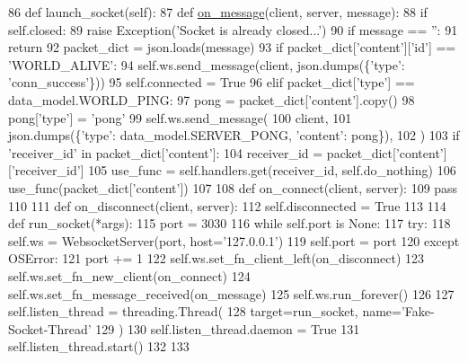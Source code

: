 \begin{DoxyCode}
86     \textcolor{keyword}{def }launch\_socket(self):
87         \textcolor{keyword}{def }\hyperlink{namespaceparlai_1_1chat__service_1_1services_1_1browser__chat_1_1client_a01c1536b48e2f5badd2fe58ea02b9a5c}{on\_message}(client, server, message):
88             \textcolor{keywordflow}{if} self.closed:
89                 \textcolor{keywordflow}{raise} Exception(\textcolor{stringliteral}{'Socket is already closed...'})
90             \textcolor{keywordflow}{if} message == \textcolor{stringliteral}{''}:
91                 \textcolor{keywordflow}{return}
92             packet\_dict = json.loads(message)
93             \textcolor{keywordflow}{if} packet\_dict[\textcolor{stringliteral}{'content'}][\textcolor{stringliteral}{'id'}] == \textcolor{stringliteral}{'WORLD\_ALIVE'}:
94                 self.ws.send\_message(client, json.dumps(\{\textcolor{stringliteral}{'type'}: \textcolor{stringliteral}{'conn\_success'}\}))
95                 self.connected = \textcolor{keyword}{True}
96             \textcolor{keywordflow}{elif} packet\_dict[\textcolor{stringliteral}{'type'}] == data\_model.WORLD\_PING:
97                 pong = packet\_dict[\textcolor{stringliteral}{'content'}].copy()
98                 pong[\textcolor{stringliteral}{'type'}] = \textcolor{stringliteral}{'pong'}
99                 self.ws.send\_message(
100                     client,
101                     json.dumps(\{\textcolor{stringliteral}{'type'}: data\_model.SERVER\_PONG, \textcolor{stringliteral}{'content'}: pong\}),
102                 )
103             \textcolor{keywordflow}{if} \textcolor{stringliteral}{'receiver\_id'} \textcolor{keywordflow}{in} packet\_dict[\textcolor{stringliteral}{'content'}]:
104                 receiver\_id = packet\_dict[\textcolor{stringliteral}{'content'}][\textcolor{stringliteral}{'receiver\_id'}]
105                 use\_func = self.handlers.get(receiver\_id, self.do\_nothing)
106                 use\_func(packet\_dict[\textcolor{stringliteral}{'content'}])
107 
108         \textcolor{keyword}{def }on\_connect(client, server):
109             \textcolor{keywordflow}{pass}
110 
111         \textcolor{keyword}{def }on\_disconnect(client, server):
112             self.disconnected = \textcolor{keyword}{True}
113 
114         \textcolor{keyword}{def }run\_socket(*args):
115             port = 3030
116             \textcolor{keywordflow}{while} self.port \textcolor{keywordflow}{is} \textcolor{keywordtype}{None}:
117                 \textcolor{keywordflow}{try}:
118                     self.ws = WebsocketServer(port, host=\textcolor{stringliteral}{'127.0.0.1'})
119                     self.port = port
120                 \textcolor{keywordflow}{except} OSError:
121                     port += 1
122             self.ws.set\_fn\_client\_left(on\_disconnect)
123             self.ws.set\_fn\_new\_client(on\_connect)
124             self.ws.set\_fn\_message\_received(on\_message)
125             self.ws.run\_forever()
126 
127         self.listen\_thread = threading.Thread(
128             target=run\_socket, name=\textcolor{stringliteral}{'Fake-Socket-Thread'}
129         )
130         self.listen\_thread.daemon = \textcolor{keyword}{True}
131         self.listen\_thread.start()
132 
133 
\end{DoxyCode}
